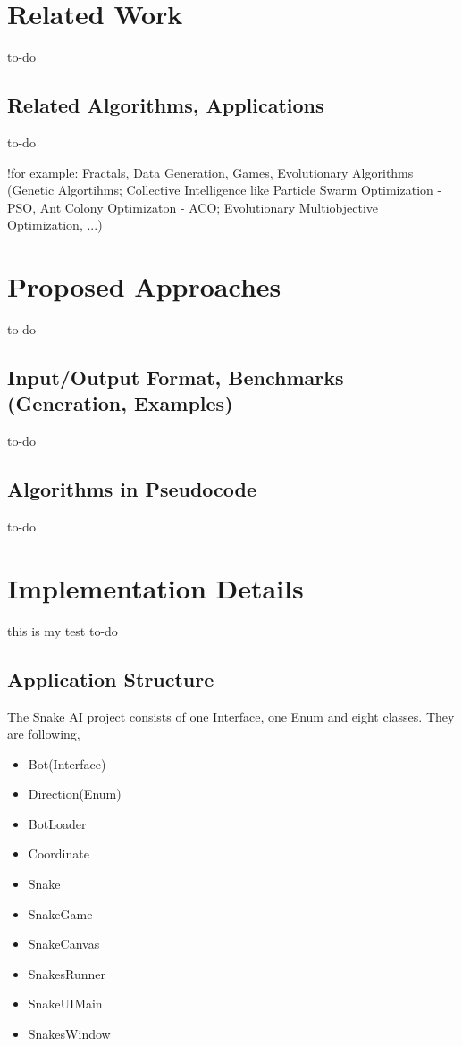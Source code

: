 \documentclass[a4paper,12pt]{article}
\begin{document}
\section{Related Work}
to-do
\subsection{Related Algorithms, Applications}
to-do

!for example: Fractals, Data Generation, Games, Evolutionary Algorithms (Genetic Algortihms; Collective Intelligence like Particle Swarm Optimization - PSO, Ant Colony Optimizaton - ACO; Evolutionary Multiobjective Optimization, ...)

\section{Proposed Approaches}
to-do
\subsection{Input/Output Format, Benchmarks (Generation, Examples)}
to-do
\subsection{Algorithms in Pseudocode}
to-do

\section{Implementation Details}
 this is my test
to-do
\subsection{Application Structure}
The Snake AI project consists of one Interface, one Enum and eight classes. They are following, 

\begin{itemize}
\item Bot(Interface)
\item Direction(Enum)
\item BotLoader
\item Coordinate
\item Snake
\item SnakeGame
\item SnakeCanvas
\item SnakesRunner
\item SnakeUIMain
\item SnakesWindow
\end{itemize}
\end{document}

